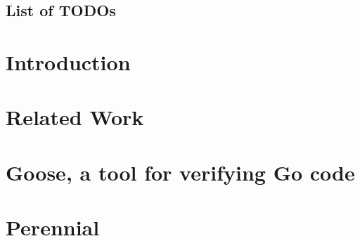 \documentclass[11pt,twoside,final]{mitthesis}
\makeatletter
\newcounter{todo}
\newcommand\listtodoname{List of TODOs}
\newcommand\listoftodos{%
  \section*{\listtodoname}\@starttoc{tod}}
\makeatother
\begin{document}




\begin{abstractpage}

\end{abstractpage}
\cleardoublepage


%

\tableofcontents
\clearpage
\listoffigures
\clearpage
\listoftodos


\chapter{Introduction}%
\label{sec:introduction}


\chapter{Related Work}%
\label{sec:related}


\chapter{Goose, a tool for verifying Go code}%
\label{sec:goose}


\chapter{Perennial}%
\label{sec:perennial}

\end{document}

